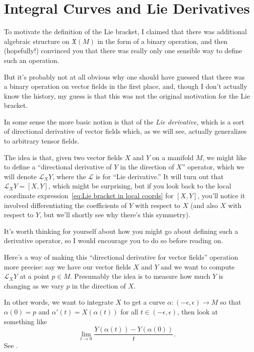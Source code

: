 
\section{Integral Curves and Lie Derivatives}

To motivate the definition of the Lie bracket, I claimed that there was additional algebraic structure on $\mathfrak{X}(M)$ in the form of a binary operation, and then (hopefully!) convinced you that there was really only one sensible way to define such an operation.

But it's probably not at all obvious why one should have guessed that there was a binary operation on vector fields in the first place, and, though I don't actually know the history, my guess is that this was not the original motivation for the Lie bracket.

In some sense the more basic notion is that of the \emph{Lie derivative}, which is a sort of directional derivative of vector fields which, as we will see, actually generalizes to arbitrary tensor fields.

The idea is that, given two vector fields $X$ and $Y$ on a manifold $M$, we might like to define a ``directional derivative of $Y$ in the direction of $X$'' operator, which we will denote $\mathcal{L}_XY$, where the $\mathcal{L}$ is for ``Lie derivative.'' It will turn out that $\mathcal{L}_XY = [X,Y]$, which might be surprising, but if you look back to the local coordinate expression~\eqref{eq:Lie bracket in local coords} for $[X,Y]$, you'll notice it involved differentiating the coefficients of $Y$ with respect to $X$ (and also $X$ with respect to $Y$, but we'll shortly see why there's this symmetry).

It's worth thinking for yourself about how you might go about defining such a derivative operator, so I would encourage you to do so before reading on.

Here's a way of making this ``directional derivative for vector fields'' operation more precise: say we have our vector fields $X$ and $Y$ and we want to compute $\mathcal{L}_XY$ at a point $p \in M$. Presumably the idea is to measure how much $Y$ is changing as we vary $p$ in the direction of $X$. 

In other words, we want to integrate $X$ to get a curve $\alpha: (-\epsilon, \epsilon) \to M$ so that $\alpha(0) = p$ and $\alpha'(t) = X(\alpha(t))$ for all $t \in (-\epsilon, \epsilon)$, then look at something like
\[
	\lim_{t\to 0} \frac{Y(\alpha(t))-Y(\alpha(0))}{t}.
\]
See .

